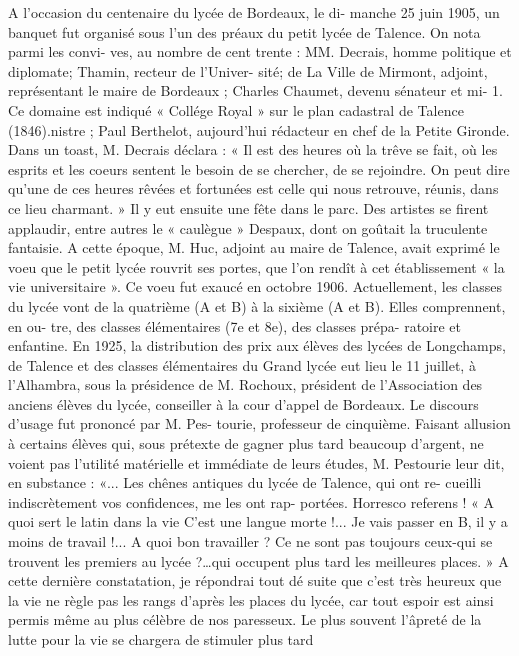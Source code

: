 \documentclass[a4paper,11pt]{book}
\begin{document}
A l'occasion du centenaire du lycée de Bordeaux, le di-
manche 25 juin 1905, un banquet fut organisé sous l'un des
préaux du petit lycée de Talence. On nota parmi les convi-
ves, au nombre de cent trente : MM. Decrais, homme
politique et diplomate; Thamin, recteur de l'Univer-
sité; de La Ville de Mirmont, adjoint, représentant le maire
de Bordeaux ; Charles Chaumet, devenu sénateur et mi-
1. Ce domaine est indiqué « Collége Royal » sur le plan cadastral de
Talence (1846).nistre ; Paul Berthelot, aujourd'hui rédacteur en chef de
la Petite Gironde.
Dans un toast, M. Decrais déclara :
« Il est des heures où la trêve se fait, où les esprits et
les coeurs sentent le besoin de se chercher, de se rejoindre.
On peut dire qu'une de ces heures rêvées et fortunées est
celle qui nous retrouve, réunis, dans ce lieu charmant. »
Il y eut ensuite une fête dans le parc. Des artistes se
firent applaudir, entre autres le « caulègue » Despaux,
dont on goûtait la truculente fantaisie.
A cette époque, M. Huc, adjoint au maire de Talence,
avait exprimé le voeu que le petit lycée rouvrit ses portes,
que l'on rendît à cet établissement « la vie universitaire ».
Ce voeu fut exaucé en octobre 1906.
Actuellement, les classes du lycée vont de la quatrième
(A et B) à la sixième (A et B). Elles comprennent, en ou-
tre, des classes élémentaires (7e et 8e), des classes prépa-
ratoire et enfantine.
En 1925, la distribution des prix aux élèves des lycées
de Longchamps, de Talence et des classes élémentaires du
Grand lycée eut lieu le 11 juillet, à l'Alhambra, sous la
présidence de M. Rochoux, président de l'Association des
anciens élèves du lycée, conseiller à la cour d'appel de
Bordeaux. Le discours d'usage fut prononcé par M. Pes-
tourie, professeur de cinquième. Faisant allusion à certains
élèves qui, sous prétexte de gagner plus tard beaucoup
d'argent, ne voient pas l'utilité matérielle et immédiate de
leurs études, M. Pestourie leur dit, en substance :
«... Les chênes antiques du lycée de Talence, qui ont re-
cueilli indiscrètement vos confidences, me les ont rap-
portées. Horresco referens ! « A quoi sert le latin dans la
vie
C'est une langue morte !... Je vais passer en B, il
y a moins de travail !... A quoi bon travailler ? Ce ne sont
pas toujours ceux-qui se trouvent les premiers au lycée
?…qui occupent plus tard les meilleures places. » A cette
dernière constatation, je répondrai tout dé suite que c'est
très heureux que la vie ne règle pas les rangs d'après les
places du lycée, car tout espoir est ainsi permis même au
plus célèbre de nos paresseux. Le plus souvent l'âpreté
de la lutte pour la vie se chargera de stimuler plus tard
\end{document}
